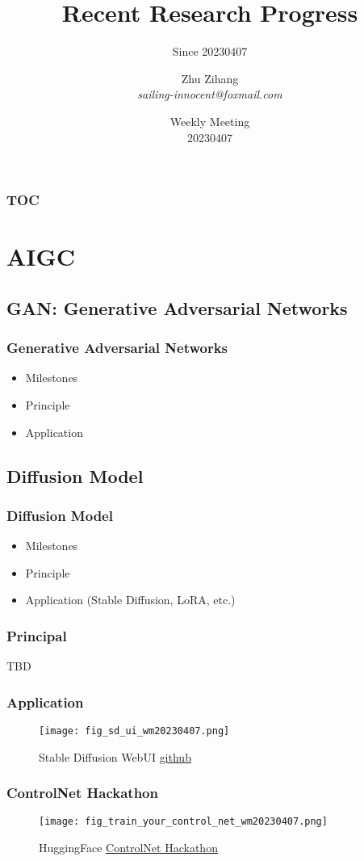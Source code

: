 \documentclass[10pt, hyperref={colorlinks=true,linkcolor=blue},xcolor=dvipsnames]{beamer}
\title[title]{ Recent Research Progress }
\subtitle{Since 20230407}
\author[Zhu Zihang]{\texorpdfstring{Zhu Zihang \\ \smallskip \textit{sailing-innocent@foxmail.com}}{}}
\date[\today]{\texorpdfstring{Weekly Meeting \\ 20230407}{}}
\begin{document}
\begin{frame}
    \titlepage
\end{frame}
\begin{frame}
    \frametitle{TOC}
    \tableofcontents
\end{frame}

\section{AIGC}
\subsection{GAN: Generative Adversarial Networks}
\begin{frame}
    \frametitle{Generative Adversarial Networks}
    \begin{itemize}
        \item Milestones
        \item Principle
        \item Application
    \end{itemize}
\end{frame}



\subsection{Diffusion Model}

\begin{frame}
    \frametitle{Diffusion Model}
    \begin{itemize}
        \item Milestones
        \item Principle
        \item Application (Stable Diffusion, LoRA, etc.)
    \end{itemize}
\end{frame}


\begin{frame}
    \frametitle{Principal}
    TBD
\end{frame}
\begin{frame}
    \frametitle{Application}
    \begin{figure}
        \texttt{[image: fig\_sd\_ui\_wm20230407.png]}
        \caption[short]{Stable Diffusion WebUI \href{https://github.com/AUTOMATIC1111/stable-diffusion-webui}{github}}
    \end{figure}
\end{frame}


\begin{frame}
    \frametitle{ControlNet Hackathon}
    \begin{figure}
        \texttt{[image: fig\_train\_your\_control\_net\_wm20230407.png]}
        \caption[short]{HuggingFace \href{https://mp.weixin.qq.com/s/6p2jwa9E6VYHBN38HlPRXQ}{ControlNet Hackathon}}
    \end{figure}
\end{frame}
\end{document}
